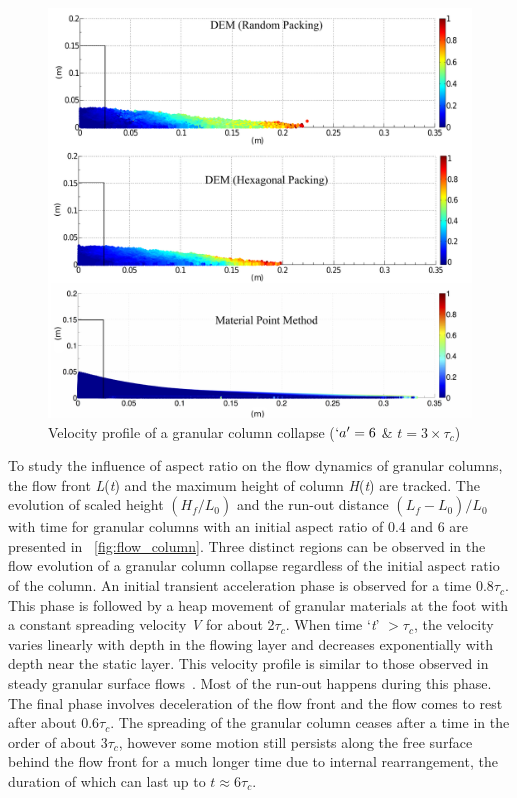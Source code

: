 \begin{figure}[tbhp]
\centering
\includegraphics[width=\textwidth]{a6f}
\caption{Velocity profile of a granular column collapse ($`a' = 6$ \& 
$t=3\times\tau_c$)}
\label{fig:a6f}
\end{figure}

To study the influence of aspect ratio on the flow dynamics of granular 
columns, the flow front \textit{L}(\textit{t}) and the maximum height of column 
\textit{H}(\textit{t}) are tracked. The evolution of scaled height 
$(H_{\textit{f}}/L_{\textit{0}})$ and the run-out distance 
$(L_{\textit{f}}-L_{\textit{0}})/L_{\textit{0}}$ with time for granular columns 
with an initial aspect ratio of 0.4 and 6 are presented in
~\cref{fig:flow_column}. Three distinct regions can be observed in the flow 
evolution of a granular column collapse regardless of the initial aspect ratio 
of the column. An initial transient acceleration phase is observed for a time 
0.8$\tau_{c}$. 
This phase is followed by a heap movement of granular materials at the foot 
with a constant spreading velocity \textit{V} for about 2$\tau_{c}$. When time 
`\textit{t}' $> \tau_{c}$, the velocity varies linearly with depth in the 
flowing layer and decreases exponentially with depth near the static layer. 
This velocity profile is similar to those observed in steady granular surface 
flows~\citep{Lajeunesse2004}. Most of the run-out happens during this phase. 
The final phase involves deceleration of the flow front and the flow comes to 
rest after about 0.6$\tau_{c}$. The spreading of the granular column ceases 
after a time in the order of about 3$\tau_{c}$, however some motion still 
persists along the free surface behind the flow front for a much longer time 
due to internal rearrangement, the duration of which can last up to $\textit{t} 
\approx 6\tau_{c}$. 

